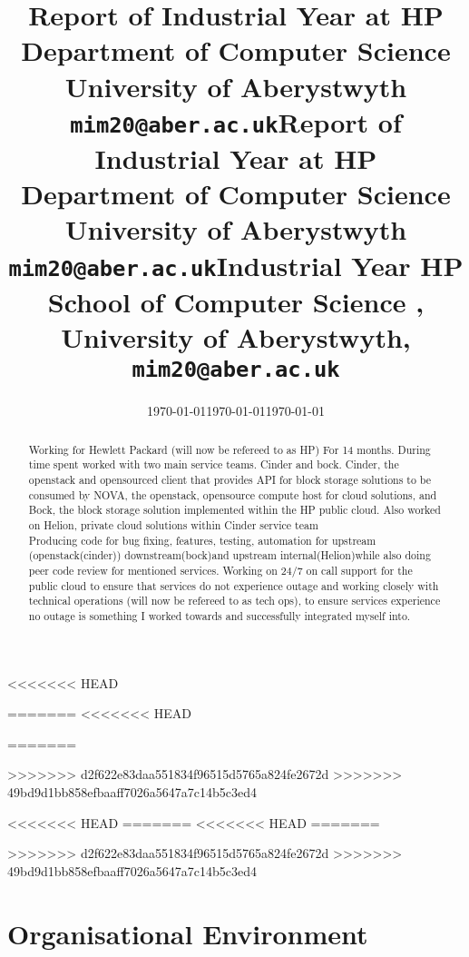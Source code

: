 \documentclass[11pt,a4paper]{report}
\begin{document}
<<<<<<< HEAD
\title{Report of Industrial Year at HP\\Department of Computer Science\\ University of Aberystwyth\\ \texttt{mim20@aber.ac.uk}} \date{\today}
=======
<<<<<<< HEAD
\title{Report of Industrial Year at HP\\Department of Computer Science\\ University of Aberystwyth\\ \texttt{mim20@aber.ac.uk}} \date{\today}
=======
\title{Industrial Year HP School of Computer Science ,\\ University of Aberystwyth,\\ \texttt{mim20@aber.ac.uk}} \date{\today}
>>>>>>> d2f622e83daa551834f96515d5765a824fe2672d
>>>>>>> 49bd9d1bb858efbaaff7026a5647a7c14b5c3ed4
\maketitle

\begin{abstract} 

Working for Hewlett Packard (will now be refereed to as HP) For 14 months. During time spent worked with two main service teams. Cinder and bock. Cinder, the openstack and opensourced client that provides API for block storage solutions to be consumed by NOVA, the openstack, opensource compute host for cloud solutions, and Bock, the block storage solution implemented within the HP public cloud. Also worked on Helion, private cloud solutions within Cinder service team\\ 
Producing code for bug fixing, features, testing, automation for upstream (openstack(cinder)) downstream(bock)and upstream internal(Helion)while also doing peer code review for mentioned services. 
Working on 24/7 on call support for the public cloud to ensure that services do not experience outage and working closely with technical operations (will now be refereed to as tech ops), to ensure services experience no outage is something I worked towards and successfully integrated myself into.

\end{abstract}

<<<<<<< HEAD
\tableofcontents
\newpage
=======
<<<<<<< HEAD
\tableofcontents
\newpage
=======

>>>>>>> d2f622e83daa551834f96515d5765a824fe2672d
>>>>>>> 49bd9d1bb858efbaaff7026a5647a7c14b5c3ed4
\section{Organisational Environment}
 
\end{document}
